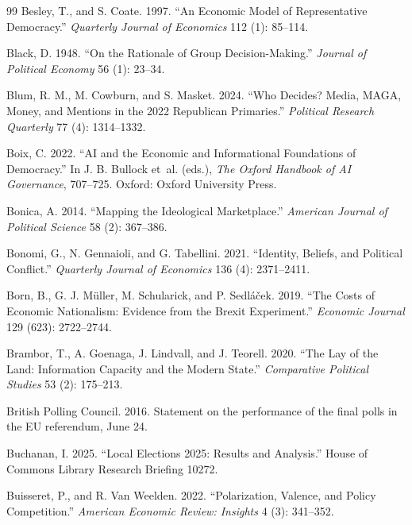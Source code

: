 \documentclass[12pt,letterpaper]{article}
\begin{document}
\begin{thebibliography}{99}
Besley, T., and S. Coate. 1997. ``An Economic Model of Representative Democracy.'' \textit{Quarterly Journal of Economics} 112 (1): 85--114.

Black, D. 1948. ``On the Rationale of Group Decision-Making.'' \textit{Journal of Political Economy} 56 (1): 23--34.

Blum, R. M., M. Cowburn, and S. Masket. 2024. ``Who Decides? Media, MAGA, Money, and Mentions in the 2022 Republican Primaries.'' \textit{Political Research Quarterly} 77 (4): 1314--1332.

Boix, C. 2022. ``AI and the Economic and Informational Foundations of Democracy.'' In J. B. Bullock et~al. (eds.), \textit{The Oxford Handbook of AI Governance}, 707--725. Oxford: Oxford University Press.

Bonica, A. 2014. ``Mapping the Ideological Marketplace.'' \textit{American Journal of Political Science} 58 (2): 367--386.

Bonomi, G., N. Gennaioli, and G. Tabellini. 2021. ``Identity, Beliefs, and Political Conflict.'' \textit{Quarterly Journal of Economics} 136 (4): 2371--2411.

Born, B., G. J. M\"{u}ller, M. Schularick, and P. Sedl\'{a}\v{c}ek. 2019. ``The Costs of Economic Nationalism: Evidence from the Brexit Experiment.'' \textit{Economic Journal} 129 (623): 2722--2744.

Brambor, T., A. Goenaga, J. Lindvall, and J. Teorell. 2020. ``The Lay of the Land: Information Capacity and the Modern State.'' \textit{Comparative Political Studies} 53 (2): 175--213.

British Polling Council. 2016. Statement on the performance of the final polls in the EU referendum, June 24.

Buchanan, I. 2025. ``Local Elections 2025: Results and Analysis.'' House of Commons Library Research Briefing 10272.

Buisseret, P., and R. Van Weelden. 2022. ``Polarization, Valence, and Policy Competition.'' \textit{American Economic Review: Insights} 4 (3): 341--352.


\end{thebibliography}
\end{document}

